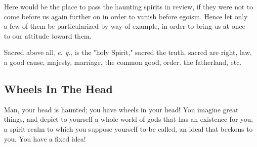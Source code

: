 Here would be the place to pass the haunting spirits in review, if they were 
not to come before us again further on in order to vanish before egoism. Hence 
let only a few of them be particularized by way of example, in order to bring 
us at once to our attitude toward them.

Sacred above all, \textit{e. g.}, is the "{}holy Spirit,"{} sacred the truth, 
sacred are right, law, a good cause, majesty, marriage, the common good, 
order, the fatherland, etc.

\subsection[Wheels In The Head]{\centering Wheels In The Head}

Man, your head is haunted; you have wheels in your head! You imagine great 
things, and depict to yourself a whole world of gods that has an existence for 
you, a spirit-realm to which you suppose yourself to be called, an ideal that 
beckons to you. You have a fixed idea!

